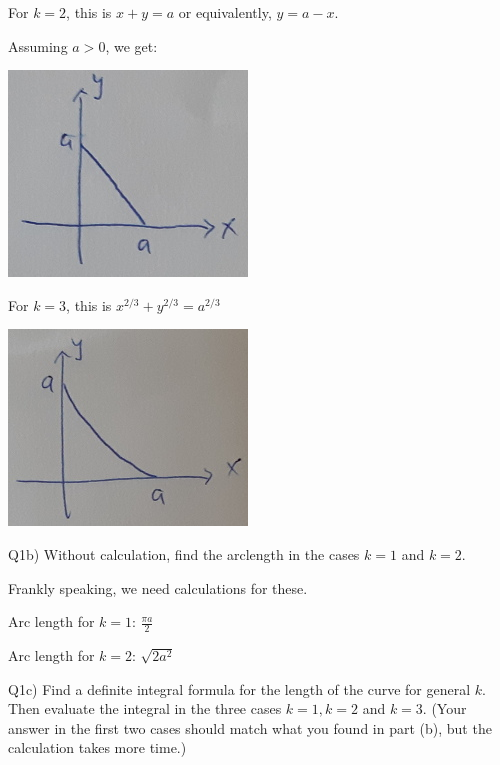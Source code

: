 \documentclass[9pt]{article}
\begin{document}
For $k = 2$, this is $x + y = a$ or equivalently, $y = a -x$.

Assuming $a > 0$, we get:

\begin{center}
  \includegraphics[scale=0.8]{1_keq2.jpg}
\end{center}

For $k = 3$, this is $x^{2/3} + y^{2/3} = a^{2/3}$

\begin{center}
  \includegraphics[scale=0.8]{1_keq3.jpg}
\end{center}


\begin{tcolorbox}
  Q1b) Without calculation, find the arclength in the cases $k = 1$ and $k = 2$.
\end{tcolorbox}

Frankly speaking, we need calculations for these.

Arc length for $k = 1$: $\frac{\pi a}{2}$

Arc length for $k = 2$: $\sqrt{2a^2}$


\begin{tcolorbox}
  Q1c) Find a definite integral formula for the length of the curve for general $k$. Then evaluate the integral in the three cases $k = 1, k = 2$ and $k = 3$. (Your answer in the first two cases should match what you found in part (b), but the calculation takes more time.)
\end{tcolorbox}
\end{document}
